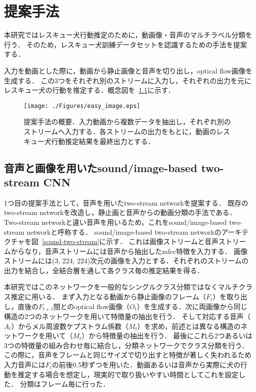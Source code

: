 \chapter{提案手法}
本研究ではレスキュー犬行動推定のために，動画像・音声のマルチラベル分類を行う．
そのため，レスキュー犬訓練データセットを認識するための手法を提案する．

入力を動画とした際に，動画から静止画像と音声を切り出し，optical flow画像を生成する．
この3つをそれぞれ別のストリームに入力し，それぞれの出力を元にレスキュー犬の行動を推定する．概念図を~\ref{easy_image}に示す．
\begin{figure}[H]
 \begin{center}
  \texttt{[image: ./Figures/easy\_image.eps]}
  \caption{提案手法の概要．入力動画から複数データを抽出し，それぞれ別のストリームへ入力する．各ストリームの出力をもとに，動画のレスキュー犬行動推定結果を最終出力とする．}
  \label{easy_image}
 \end{center}
\end{figure}

\section{音声と画像を用いたsound/image-based two-stream CNN}
1つ目の提案手法として，音声を用いたtwo-stream networkを提案する．
既存のtwo-stream networkを改造し，静止画と音声からの動画分類の手法である．
Two-stream networkと違い音声を用いるため，これをsound/image-based two-stream networkと呼称する．
sound/image-based two-stream networkのアーキテクチャを図~\ref{sound-two-stream}に示す．
これは画像ストリームと音声ストリームからなり，音声ストリームには音声から抽出したmfcc特徴を入力する．
画像ストリームには(3, 224, 224)次元の画像を入力とする．それぞれのストリームの出力を結合し，全結合層を通して各クラス毎の推定結果を得る．

本研究ではこのネットワークを一般的なシングルクラス分類ではなくマルチクラス推定に用いる．
まず入力となる動画から静止画像のフレーム（$F_t$）を取り出し，直後の$F_{t+1}$間とのoptical flow画像（$O_t$）を生成する．次に両画像から同じ構造の2つのネットワークを用いて特徴量の抽出を行う．
そして対応する音声（$A_t$）からメル周波数ケプストラム係数（$M_t$）を求め，前述とは異なる構造のネットワークを用いて（$M_t$）から特徴量の抽出を行う．
最後にこれら2つあるいは3つの特徴量の組み合わせ毎に結合し，分類ネットワークでクラス分類を行う．
この際に，音声をフレームと同じサイズで切り出すと特徴が著しく失われるため入力音声には$F_t$の前後0.5秒ずつを用いた．動画あるいは音声から実際に犬の行動を推定する場合を想定し，現実的で取り扱いやすい時間としてこれを設定した．
分類はフレーム毎に行った．

